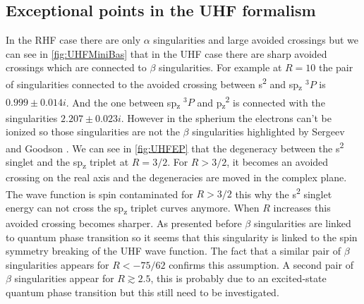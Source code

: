 \documentclass[11pt,a4paper]{article}
\begin{document}
\subsection{Exceptional points in the UHF formalism}\label{sec:uhfSing}

In the RHF case there are only $\alpha$ singularities and large avoided crossings but we can see in \autoref{fig:UHFMiniBas} that in the UHF case there are sharp avoided crossings which are connected to $\beta$ singularities. For example at $R=10$ the pair of singularities connected to the avoided crossing between s\textsuperscript{2} and sp\textsubscript{z} $^{3}P$ is $0.999\pm0.014i$. And the one between sp\textsubscript{z} $^{3}P$ and p\textsubscript{z}\textsuperscript{2} is connected with the singularities $2.207\pm0.023i$. However in the spherium the electrons can't be ionized so those singularities are not the $\beta$ singularities highlighted by Sergeev and Goodson \cite{Sergeev_2005}. We can see in \autoref{fig:UHFEP} that the degeneracy between the s\textsuperscript{2} singlet and the sp\textsubscript{z} triplet at $R=3/2$. For $R>3/2$, it becomes an avoided crossing on the real axis and the degeneracies are moved in the complex plane. The wave function is spin contaminated for $R>3/2$ this why the s\textsuperscript{2} singlet energy can not cross the sp\textsubscript{z} triplet curves anymore. When $R$ increases this avoided crossing becomes sharper. As presented before $\beta$ singularities are linked to quantum phase transition so it seems that this singularity is linked to the spin symmetry breaking of the UHF wave function. The fact that a similar pair of $\beta$ singularities appears for $R<-75/62$ confirms this assumption. A second pair of $\beta$ singularities appear for $R\gtrsim 2.5$, this is probably due to an excited-state quantum phase transition but this still need to be investigated. 
\end{document}
